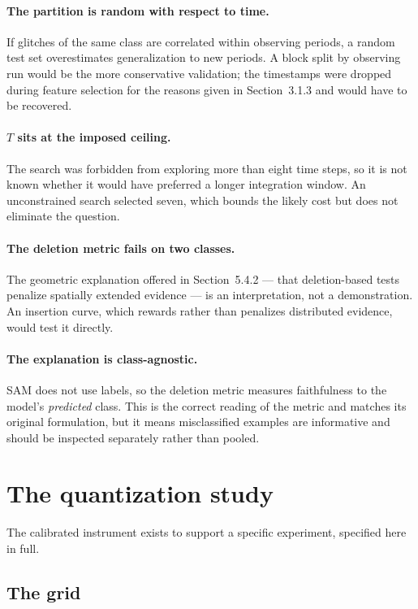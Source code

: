 \paragraph{The partition is random with respect to time.} If glitches of the same
class are correlated within observing periods, a random test set overestimates
generalization to new periods. A block split by observing run would be the more
conservative validation; the timestamps were dropped during feature selection for
the reasons given in Section~3.1.3 and would have to be recovered.

\paragraph{$T$ sits at the imposed ceiling.} The search was forbidden from
exploring more than eight time steps, so it is not known whether it would have
preferred a longer integration window. An unconstrained search selected seven,
which bounds the likely cost but does not eliminate the question.

\paragraph{The deletion metric fails on two classes.} The geometric explanation
offered in Section~5.4.2 --- that deletion-based tests penalize spatially
extended evidence --- is an interpretation, not a demonstration. An insertion
curve, which rewards rather than penalizes distributed evidence, would test it
directly.

\paragraph{The explanation is class-agnostic.} SAM does not use labels, so the
deletion metric measures faithfulness to the model's \emph{predicted} class. This
is the correct reading of the metric and matches its original formulation, but it
means misclassified examples are informative and should be inspected separately
rather than pooled.

\section{The quantization study}
\label{sec:grid}

The calibrated instrument exists to support a specific experiment, specified here
in full.

\subsection{The grid}


